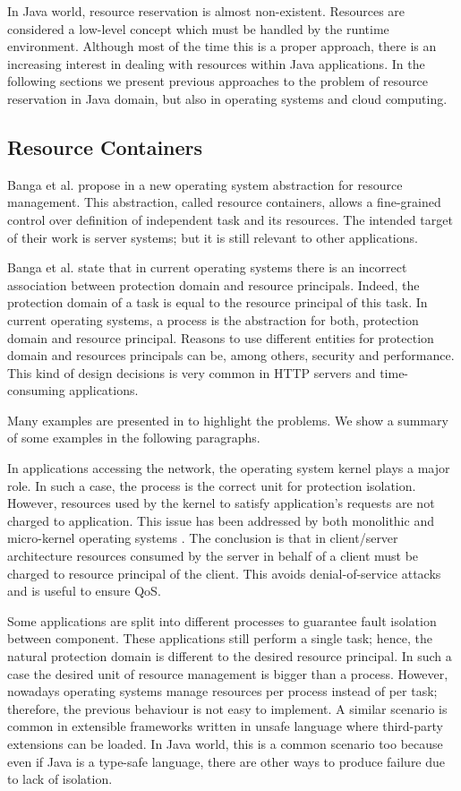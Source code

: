 In Java world, resource reservation is almost non-existent.
Resources are considered a low-level concept which must be handled by the runtime environment.
Although most of the time this is a proper approach, there is an increasing interest in dealing with resources within Java applications.
In the following sections we present previous approaches to the problem of resource reservation in Java domain, but also in operating systems and cloud computing.

\subsection{Resource Containers}
Banga et al. propose in \cite{Banga:1999:RCN:296806.296810} a new operating system abstraction for resource management.
This abstraction, called resource containers, allows a fine-grained control over definition of independent task and its resources.
The intended target of their work is server systems; but it is still relevant to other applications.

Banga et al. state that in current operating systems there is an incorrect association between protection domain and resource principals.
Indeed, the protection domain of a task is equal to the resource principal of this task.
In current operating systems, a process is the abstraction for both, protection domain and resource principal.
Reasons to use different entities for protection domain and resources principals can be, among others, security and performance.
This kind of design decisions is very common in HTTP servers and time-consuming applications.

Many examples are presented in \cite{Banga:1999:RCN:296806.296810} to highlight the problems.
We show a summary of some examples in the following paragraphs.

In applications accessing the network, the operating system kernel plays a major role.
In such a case, the process is the correct unit for protection isolation.
However, resources used by the kernel to satisfy application's requests are not charged to application.
This issue has been addressed by both monolithic and micro-kernel operating systems \cite{Bao:2008:HPI:1384529.1375484}.
The conclusion is that in client/server architecture resources consumed by the server in behalf of a client must be charged to resource principal of the client.
This avoids denial-of-service attacks and is useful to ensure QoS.

Some applications are split into different processes to guarantee fault isolation between component.
These applications still perform a single task; hence, the natural protection domain is different to the desired resource principal.
In such a case the desired unit of resource management is bigger than a process.
However, nowadays operating systems manage resources per process instead of per task; therefore, the previous behaviour is not easy to implement.
A similar scenario is common in extensible frameworks written in unsafe language where third-party extensions can be loaded.
In Java world, this is a common scenario too because even if Java is a type-safe language, there are other ways to produce failure due to lack of isolation.

